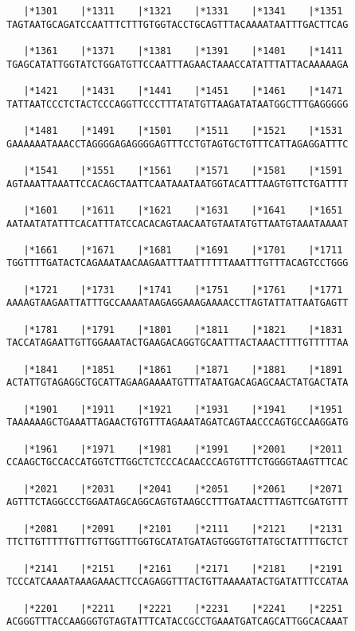 \documentclass{article}
\begin{document}
\begin{Verbatim}
   |*1301    |*1311    |*1321    |*1331    |*1341    |*1351 
TAGTAATGCAGATCCAATTTCTTTGTGGTACCTGCAGTTTACAAAATAATTTGACTTCAG
  
   |*1361    |*1371    |*1381    |*1391    |*1401    |*1411 
TGAGCATATTGGTATCTGGATGTTCCAATTTAGAACTAAACCATATTTATTACAAAAAGA
  
   |*1421    |*1431    |*1441    |*1451    |*1461    |*1471 
TATTAATCCCTCTACTCCCAGGTTCCCTTTATATGTTAAGATATAATGGCTTTGAGGGGG
  
   |*1481    |*1491    |*1501    |*1511    |*1521    |*1531 
GAAAAAATAAACCTAGGGGAGAGGGGAGTTTCCTGTAGTGCTGTTTCATTAGAGGATTTC
  
   |*1541    |*1551    |*1561    |*1571    |*1581    |*1591 
AGTAAATTAAATTCCACAGCTAATTCAATAAATAATGGTACATTTAAGTGTTCTGATTTT
  
   |*1601    |*1611    |*1621    |*1631    |*1641    |*1651 
AATAATATATTTCACATTTATCCACACAGTAACAATGTAATATGTTAATGTAAATAAAAT
  
   |*1661    |*1671    |*1681    |*1691    |*1701    |*1711 
TGGTTTTGATACTCAGAAATAACAAGAATTTAATTTTTTAAATTTGTTTACAGTCCTGGG
  
   |*1721    |*1731    |*1741    |*1751    |*1761    |*1771 
AAAAGTAAGAATTATTTGCCAAAATAAGAGGAAAGAAAACCTTAGTATTATTAATGAGTT
  
   |*1781    |*1791    |*1801    |*1811    |*1821    |*1831 
TACCATAGAATTGTTGGAAATACTGAAGACAGGTGCAATTTACTAAACTTTTGTTTTTAA
  
   |*1841    |*1851    |*1861    |*1871    |*1881    |*1891 
ACTATTGTAGAGGCTGCATTAGAAGAAAATGTTTATAATGACAGAGCAACTATGACTATA
  
   |*1901    |*1911    |*1921    |*1931    |*1941    |*1951 
TAAAAAAGCTGAAATTAGAACTGTGTTTAGAAATAGATCAGTAACCCAGTGCCAAGGATG
  
   |*1961    |*1971    |*1981    |*1991    |*2001    |*2011 
CCAAGCTGCCACCATGGTCTTGGCTCTCCCACAACCCAGTGTTTCTGGGGTAAGTTTCAC
  
   |*2021    |*2031    |*2041    |*2051    |*2061    |*2071 
AGTTTCTAGGCCCTGGAATAGCAGGCAGTGTAAGCCTTTGATAACTTTAGTTCGATGTTT
  
   |*2081    |*2091    |*2101    |*2111    |*2121    |*2131 
TTCTTGTTTTTGTTTGTTGGTTTGGTGCATATGATAGTGGGTGTTATGCTATTTTGCTCT
  
   |*2141    |*2151    |*2161    |*2171    |*2181    |*2191 
TCCCATCAAAATAAAGAAACTTCCAGAGGTTTACTGTTAAAAATACTGATATTTCCATAA
  
   |*2201    |*2211    |*2221    |*2231    |*2241    |*2251 
ACGGGTTTACCAAGGGTGTAGTATTTCATACCGCCTGAAATGATCAGCATTGGCACAAAT
  

\end{Verbatim}
\end{document}
